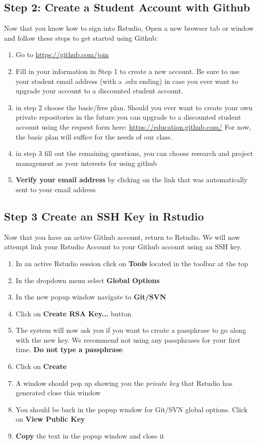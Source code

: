 \documentclass{article}\usepackage[]{graphicx}\usepackage[]{color}
\begin{document}
  \subsection*{Step 2: Create a Student Account with Github}
 Now that you know how to sign into Rstudio, Open a new browser tab or window and follow these steps to get started using Github:
    \begin{enumerate}
    \item Go to \url{https://github.com/join}
    \item Fill in your information in Step 1 to create a new account. Be sure to use your student email address (with a .edu ending) in case you ever want to upgrade your account to a discounted student account. 
    \item in step 2 choose the basic/free plan. Should you ever want to create your own private repositories in the future you can upgrade to a discounted student account using the request form here: \url{https://education.github.com/} For now, the basic plan will suffice for the needs of our class. 
    \item in step 3 fill out the remaining questions, you can choose research and project management as your interests for using github
    
    \item \textbf{Verify your email address} by clicking on the link that was automatically sent to your email address
    \end{enumerate}
    
    
  \subsection*{Step 3 Create an SSH Key in Rstudio}
Now that you have an active Github account, return to Rstudio. We will now attempt link your Rstudio Account to your Github account using an SSH key. 
  \begin{enumerate}
  \item In an active Rstudio session click on \textbf{Tools} located in the toolbar at the top
  \item In the dropdown menu select \textbf{Global Options}
  \item In the new popup window navigate to \textbf{Git/SVN} 
  \item Click on \textbf{Create RSA Key...} button
  \item The system will now ask you if you want to create a passphrase to go along with the new key. We recommend not using any passphrases for your first time. \textbf{Do not type a passphrase}
  \item Click on \textbf{Create}
  \item A window should pop up showing you the \emph{private key} that Rstudio has generated close this window
  \item You should be back in the popup window for Git/SVN global options. Click on \textbf{View Public Key}
  \item \textbf{Copy} the text in the popup window and close it
  \end{enumerate}
\end{document}
